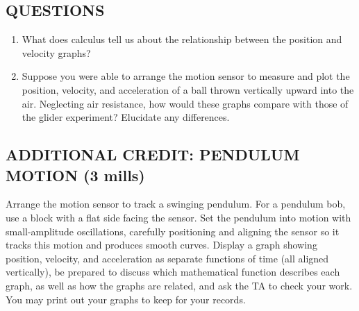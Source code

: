 \subsection*{QUESTIONS}

\begin{enumerate}[label=\alph*.]

\item What does calculus tell us about the relationship between the position and velocity graphs?

\item Suppose you were able to arrange the motion sensor to measure and plot the position, velocity, and acceleration of a ball thrown vertically upward into the air.  Neglecting air resistance, how would these graphs compare with those of the glider experiment?  Elucidate any differences.

\end{enumerate}

\subsection*{ADDITIONAL CREDIT: PENDULUM MOTION (3 mills)}

Arrange the motion sensor to track a swinging pendulum.  For a pendulum bob, use a block with a flat side facing the sensor.  Set the pendulum into motion with small-amplitude oscillations, carefully positioning and aligning the sensor so it tracks this motion and produces smooth curves.  Display a graph showing position, velocity, and acceleration as separate functions of time (all aligned vertically), be prepared to discuss which mathematical function describes each graph, as well as how the graphs are related, and ask the TA to check your work.  You may print out your graphs to keep for your records.
